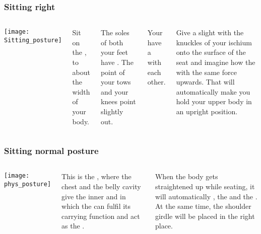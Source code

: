 \begin{frame}
\frametitle{Sitting right}
\hypertarget{posture_sitting}{}
\begin{columns}[c] %


\texttt{[image: Sitting\_posture]}

Sit on the ,  to about the width of your body. 

The soles of both your feet have . The point of your tows and your knees point slightly out. 

Your  have a  with each other. 

Give a slight  with the knuckles of your ischium  onto the surface of the seat and imagine how the  with the same force upwards. That will automatically make you hold your upper body in an upright position.
\end{columns}

\end{frame}
\begin{frame}
\frametitle{Sitting normal posture}

\begin{columns}[c] %


\texttt{[image: phys\_posture]}

This is the , where the chest and the belly cavity give the inner  and in which the  can fulfil its carrying function and act as the . 

When the body gets straightened up while seating, it will automatically , the  and the . At the same time, the shoulder girdle will be placed in the right place.
\end{columns}

\end{frame}
